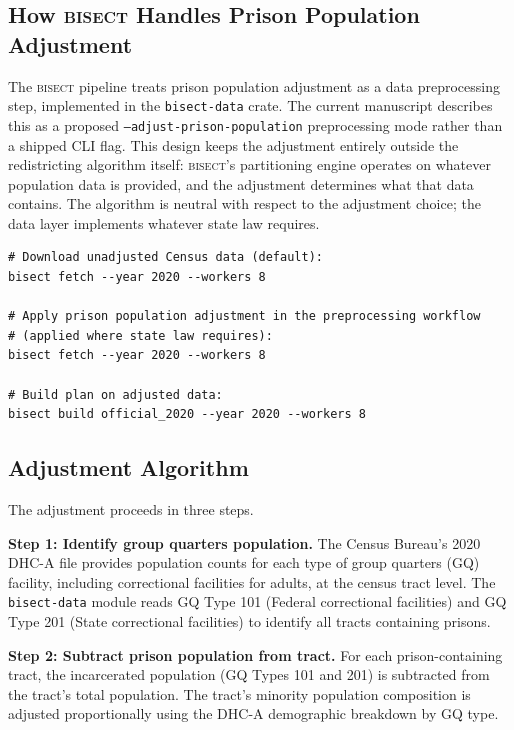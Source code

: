 \label{sec:methodology}

\subsection{How \textsc{bisect} Handles Prison Population Adjustment}

The \textsc{bisect} pipeline treats prison population adjustment as a
data preprocessing step, implemented in the \texttt{bisect-data} crate.
The current manuscript describes this as a proposed
\texttt{--adjust-prison-population} preprocessing mode rather than a shipped
CLI flag. This design keeps the adjustment entirely outside
the redistricting algorithm itself: \textsc{bisect}'s partitioning engine
operates on whatever population data is provided, and the adjustment
determines what that data contains. The algorithm is neutral with respect
to the adjustment choice; the data layer implements whatever state law requires.

\begin{verbatim}
# Download unadjusted Census data (default):
bisect fetch --year 2020 --workers 8

# Apply prison population adjustment in the preprocessing workflow
# (applied where state law requires):
bisect fetch --year 2020 --workers 8

# Build plan on adjusted data:
bisect build official_2020 --year 2020 --workers 8
\end{verbatim}

\subsection{Adjustment Algorithm}

The adjustment proceeds in three steps.

\textbf{Step 1: Identify group quarters population.} The Census Bureau's
2020 DHC-A file provides population counts for each type of group quarters
(GQ) facility, including correctional facilities for adults, at the census
tract level. The \texttt{bisect-data} module reads GQ Type 101 (Federal
correctional facilities) and GQ Type 201 (State correctional facilities)
to identify all tracts containing prisons.

\textbf{Step 2: Subtract prison population from tract.} For each
prison-containing tract, the incarcerated population (GQ Types 101 and 201)
is subtracted from the tract's total population. The tract's minority
population composition is adjusted proportionally using the DHC-A
demographic breakdown by GQ type.

